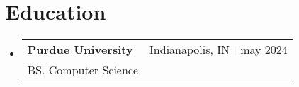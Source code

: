 \documentclass[letterpaper,11pt]{article}
\makeatletter
\newcommand{\resumeEducationHeading}[4]{
  \item
    \begin{tabular*}{0.97\textwidth}[t]{l@{\extracolsep{\fill}}r}
      \textbf{#1} & \scriptsize #2 \\
      \small#3 & \\
    \end{tabular*}
    \vspace{-3pt} %
}
\newcommand{\resumeProjectHeading}[2]{
    \vspace{3pt}\item
    \begin{tabular*}{0.97\textwidth}{l@{\extracolsep{\fill}}r}
      \small#1 & #2 \\
    \end{tabular*}\vspace{-9pt}
}
\newcommand{\resumeSubHeadingListStart}{\begin{itemize}[leftmargin=0.15in, label={}]}
\newcommand{\resumeSubHeadingListEnd}{\end{itemize}}
\newcommand{\resumeSectionBody}[1]{
  \vspace{0.7em}
  \small #1
  \vspace{-5pt}
}
\makeatother
\begin{document}








     
\section{Education}
  \resumeSubHeadingListStart
    \resumeEducationHeading
      {Purdue University}{Indianapolis, IN $|$ may 2024}
      {BS. Computer Science\footnotesize{}}{\textbf{Relevant Coursework:} }
    
      
\resumeSubHeadingListEnd
\end{document}
